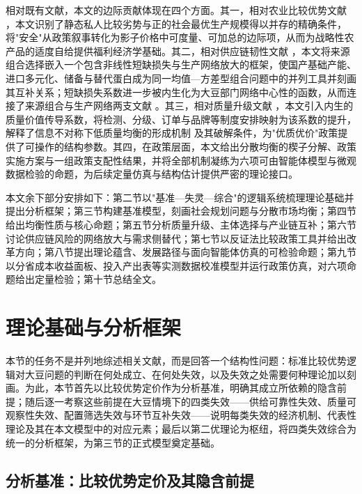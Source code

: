 \documentclass[UTF8,zihao=-4,fontset=fandol]{ctexart}
\numberwithin{equation}{section}
\theoremstyle{definition}
\theoremstyle{remark}
\begin{document}
相对既有文献，本文的边际贡献体现在四个方面。其一，相对农业比较优势文献 \parencite{CostinotDonaldsonSmith2016}，本文识别了静态私人比较劣势与正的社会最优生产规模得以并存的精确条件，将"安全"从政策叙事转化为影子价格中可度量、可加总的边际项，从而为战略性农产品的适度自给提供福利经济学基础。其二，相对供应链韧性文献 \parencite{GrossmanHelpmanLhuillier2023}，本文将来源组合选择嵌入一个包含非线性短缺损失与生产网络放大的框架，使国产基础产能、进口多元化、储备与替代蛋白成为同一均值—方差型组合问题中的并列工具并刻画其互补关系；短缺损失系数进一步被内生化为大豆部门网络中心性的函数，从而连接了来源组合与生产网络两支文献 \parencite{AcemogluEtAl2012}。其三，相对质量升级文献 \parencite{Verhoogen2008,KuglerVerhoogen2012}，本文引入内生的质量价值传导系数，将检测、分级、订单与品牌等制度安排映射为该系数的提升，解释了信息不对称下低质量均衡的形成机制 \parencite{Akerlof1970} 及其破解条件，为"优质优价"政策提供了可操作的结构参数。其四，在政策层面，本文给出分散均衡的楔子分解、政策实施方案与一组政策支配性结果，并将全部机制凝练为六项可由智能体模型与微观数据检验的命题，为后续定量仿真与结构估计提供严密的理论接口。

本文余下部分安排如下：第二节以"基准—失灵—综合"的逻辑系统梳理理论基础并提出分析框架；第三节构建基准模型，刻画社会规划问题与分散市场均衡；第四节给出均衡性质与核心命题；第五节分析质量升级、主体选择与产业链互补；第六节讨论供应链风险的网络放大与需求侧替代；第七节以反证法比较政策工具并给出改革方向；第八节提出理论蕴含、发展路径与面向智能体仿真的可检验命题；第九节以分省成本收益面板、投入产出表等实测数据校准模型并运行政策仿真，对六项命题给出定量检验；第十节总结全文。

\section{理论基础与分析框架}

本节的任务不是并列地综述相关文献，而是回答一个结构性问题：标准比较优势逻辑对大豆问题的判断在何处成立、在何处失效，以及失效之处需要何种理论加以刻画。为此，本节首先以比较优势定价作为分析基准，明确其成立所依赖的隐含前提；随后逐一考察这些前提在大豆情境下的四类失效——供给可靠性失效、质量可观察性失效、配置筛选失效与环节互补失效——说明每类失效的经济机制、代表性理论及其在本文模型中的对应元素；最后以第二优理论为枢纽，将四类失效综合为统一的分析框架，为第三节的正式模型奠定基础。

\subsection{分析基准：比较优势定价及其隐含前提}
\end{document}
